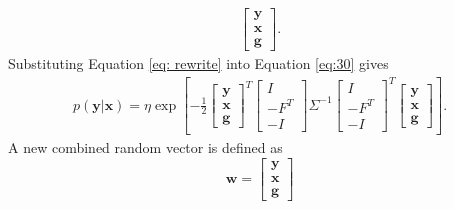 \documentclass[12pt,oneside,openany,a4paper, %
afrikaans,english,
]{memoir}
\numberwithin{equation}{chapter}
\begin{document}
{\begin{equation}
\begin{split}
\begin{bmatrix}
\bm{y}\\
\bm{x}\\
\bm{g}
\end{bmatrix}.
\end{split}
\end{equation}
Substituting Equation \ref{eq: rewrite} into Equation \ref{eq:30} gives
\begin{equation}
\label{eq:32}
\begin{split}
p(\bm{y}|\bm{x}) = \eta\exp\left[-\frac{1}{2}
\begin{bmatrix}
\bm{y}\\
\bm{x}\\
\bm{g}
\end{bmatrix}^T
\begin{bmatrix}
I\\-F^T\\-I
\end{bmatrix}
\Sigma^{-1}
\begin{bmatrix}
I\\-F^T\\-I
\end{bmatrix}^T
\begin{bmatrix}
\bm{y}\\
\bm{x}\\
\bm{g}
\end{bmatrix}
\right].
\end{split}
\end{equation}
A new combined random vector is defined as
\begin{equation}\label{eq:ranVec}
\bm{w} = 
\begin{bmatrix}
\bm{y}\\
\bm{x}\\
\bm{g}


\end{bmatrix}
\end{equation}}
\end{document}
